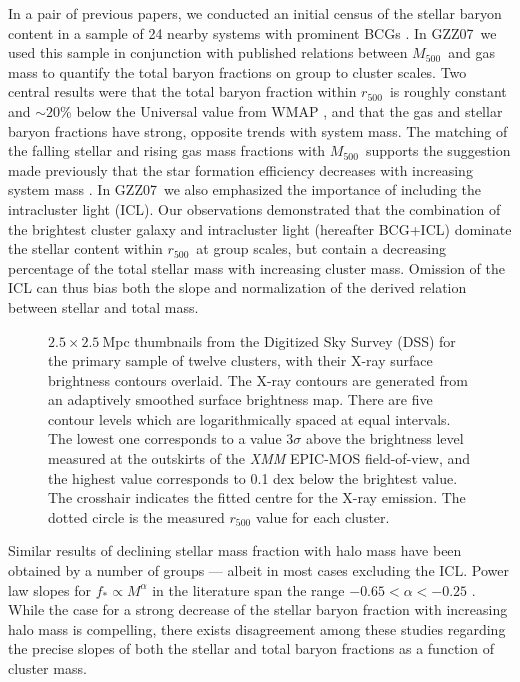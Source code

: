 \documentclass[preprint]{emulateapj}
\newcommand\rfive{$r_{500}$}
\newcommand\pone{GZZ05}
\newcommand\ptwo{GZZ07}
\newcommand\mfive{${M}_{500}$}
\begin{document}
In a pair of previous papers, we conducted an initial census of the
stellar baryon content in a sample of 24 nearby systems with prominent
BCGs \citep[][hereafter \pone\ and
\ptwo]{gonzalez2005,gonzalez2007}. In \ptwo\ we used this sample in
conjunction with published relations between \mfive\ and gas mass to
quantify the total baryon fractions on group to cluster scales.  Two
central results were that the total baryon fraction within \rfive\ is
roughly constant and $\sim20$\% below the Universal value from WMAP
\citep{komatsu2011}, and that the gas and stellar baryon fractions
have strong, opposite trends with system mass. The matching of the
falling stellar and rising gas mass fractions with \mfive\ supports
the suggestion made previously that the star formation efficiency
decreases with increasing system mass \citep{bryan2000,lin2003}. In
\ptwo\ we also emphasized the importance of including the intracluster
light (ICL).  Our observations demonstrated that the combination of
the brightest cluster galaxy and intracluster light (hereafter
BCG+ICL) dominate the stellar content within \rfive\ at group scales,
but contain a decreasing percentage of the total stellar mass with
increasing cluster mass. Omission of the ICL can thus bias both the
slope and normalization of the derived relation between stellar and
total mass.


\begin{figure*}
\caption{$2.5\times2.5\:$Mpc thumbnails from the Digitized Sky Survey (DSS) for the primary sample of twelve clusters, with their X-ray surface brightness contours overlaid. The X-ray contours are generated from an adaptively smoothed surface brightness map. There are five contour levels which are logarithmically spaced at equal intervals. The lowest one corresponds to a value 3$\sigma$ above the brightness level measured at the outskirts of the {\it XMM} EPIC-MOS field-of-view, and the highest value corresponds to 0.1 dex below the brightest value. 
The crosshair indicates the fitted centre for the X-ray emission. The dotted circle is the measured $r_{500}$ value for each cluster.
 \label{fig:dssxrayplot}}
\end{figure*}


Similar results of declining stellar mass fraction with halo mass have
been obtained by a number of groups --- albeit in most cases excluding
the ICL.  Power law slopes for $f_*\propto M^{\alpha}$ in the
literature span the range $-0.65<\alpha<-0.25$ \citep[e.g.,
][]{lin2003,lagana2008,giodini2009,andreon2010,lagana2011,zhang2011,lin2012}. While
the case for a strong decrease of the stellar baryon fraction with
increasing halo mass is compelling, there exists disagreement among
these studies regarding the precise slopes of both the stellar and
total baryon fractions as a function of cluster mass.
\end{document}
